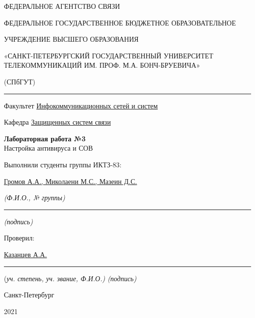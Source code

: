 \documentclass[a4paper,14pt]{extarticle}
\begin{document}
    \begin{center}
        \thispagestyle{empty}
        \begin{singlespace}
        ФЕДЕРАЛЬНОЕ АГЕНТСТВО СВЯЗИ

        ФЕДЕРАЛЬНОЕ ГОСУДАРСТВЕННОЕ БЮДЖЕТНОЕ ОБРАЗОВАТЕЛЬНОЕ

        УЧРЕЖДЕНИЕ ВЫСШЕГО ОБРАЗОВАНИЯ

        «САНКТ-ПЕТЕРБУРГСКИЙ ГОСУДАРСТВЕННЫЙ УНИВЕРСИТЕТ ТЕЛЕКОММУНИКАЦИЙ ИМ. ПРОФ. М.А. БОНЧ-БРУЕВИЧА»

        (СПбГУТ)
        \end{singlespace}
        \vspace{-1ex}
        \rule{\textwidth}{0.4pt}
        \vspace{-5ex}

        Факультет \underline{Инфокоммуникационных сетей и систем}

        Кафедра \underline{Защищенных систем связи}
        \vspace{10ex}

        \textbf{Лабораторная работа №3}\\
        Настройка антивируса и СОВ
        


    \end{center}
    \vspace{4ex}
    \begin{flushright}
    \parbox{10 cm}{
    \begin{flushleft}
        Выполнили студенты группы ИКТЗ-83:

        \underline{Громов А.А., Миколаени М.С., Мазеин Д.С.} \hfill 

        \footnotesize \textit{ (Ф.И.О., № группы)} \hfill \rule[-0.85ex]{0.1\textwidth}{0.6pt}
        
        \hfill \textit{(подпись)} \normalsize

        Проверил:

        \underline{Казанцев А.А.} \hfill \rule[-0.85ex]{0.1\textwidth}{0.6pt}

        (\footnotesize \textit{уч. степень, уч. звание, Ф.И.О.) \hfill (подпись)} \normalsize

    \end{flushleft}
    }
    \end{flushright}
    \begin{center}
        \vfill
        Санкт-Петербург

        2021

    \end{center}
    \newpage
\end{document}
